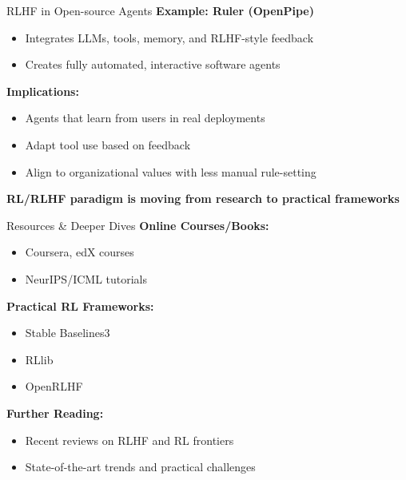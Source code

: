 \documentclass[aspectratio=169]{beamer}
\begin{document}
\begin{frame}{RLHF in Open-source Agents}
  \textbf{Example: Ruler (OpenPipe)}
  \begin{itemize}
    \item Integrates LLMs, tools, memory, and RLHF-style feedback
    \item Creates fully automated, interactive software agents
  \end{itemize}

  \vspace{0.5cm}
  \textbf{Implications:}
  \begin{itemize}
    \item Agents that learn from users in real deployments
    \item Adapt tool use based on feedback
    \item Align to organizational values with less manual rule-setting
  \end{itemize}

  \vspace{0.5cm}
  \centering
  \textbf{RL/RLHF paradigm is moving from research to practical frameworks}
\end{frame}

\begin{frame}{Resources \& Deeper Dives}
  \textbf{Online Courses/Books:}
  \begin{itemize}
    \item Coursera, edX courses
    \item NeurIPS/ICML tutorials
  \end{itemize}

  \vspace{0.3cm}
  \textbf{Practical RL Frameworks:}
  \begin{itemize}
    \item Stable Baselines3
    \item RLlib
    \item OpenRLHF
  \end{itemize}

  \vspace{0.3cm}
  \textbf{Further Reading:}
  \begin{itemize}
    \item Recent reviews on RLHF and RL frontiers
    \item State-of-the-art trends and practical challenges
  \end{itemize}
\end{frame}
\end{document}
